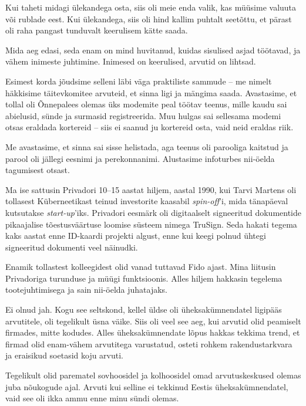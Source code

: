 
Kui taheti midagi ülekandega osta, siis oli meie enda valik, kas 
müüsime valuuta või rublade eest. Kui ülekandega, 
siis oli hind kallim puhtalt seetõttu, et pärast oli raha pangast tunduvalt keerulisem kätte saada.


Mida aeg edasi, seda enam on mind 
huvitanud, kuidas sisulised asjad töötavad, ja vähem 
inimeste juhtimine. Inimesed on keerulised, arvutid on 
lihtsad.


Esimest korda jõudsime selleni läbi väga praktiliste sammude -- me nimelt häkkisime 
täitevkomitee arvuteid, et sinna ligi ja mängima saada. 
Avastasime, et tollal oli Õnnepalees olemas üks modemite peal 
töötav teenus, mille kaudu sai abielusid, sünde ja surmasid registreerida. Muu hulgas sai sellesama 
modemi otsas eraldada kortereid -- siis ei saanud ju kortereid osta, 
vaid neid eraldas riik.


Me avastasime, et sinna sai sisse helistada, aga teenus oli parooliga kaitstud 
ja parool oli jällegi eesnimi ja perekonnanimi. Alustasime infoturbes nii-öelda 
tagumisest otsast.

Ma ise sattusin Privadori 10--15 aastat hiljem, 
aastal 1990, kui Tarvi Martens oli tollasest Küberneetikast teinud 
investorite kaasabil \emph{spin-off}'i, 
mida tänapäeval kutsutakse \emph{start-up}'iks. Privadori eesmärk oli 
digitaalselt signeeritud dokumentide pikaajalise tõestusväärtuse loomise 
süsteem nimega TruSign. Seda hakati tegema kaks aastat enne ID-kaardi 
projekti algust, enne kui keegi polnud ühtegi signeeritud dokumenti veel näinudki.


Enamik tollastest kolleegidest olid vanad tuttavad Fido ajast. Mina liitusin Privadoriga 
turunduse ja müügi funktsioonis. Alles hiljem hakkasin tegelema
tootejuhtimisega ja sain nii-öelda juhatajaks. 


Ei olnud jah. Kogu see seltskond, kellel üldse oli üheksakümnendatel 
ligipääs arvutitele, oli tegelikult üsna väike. Siis oli veel see aeg, kui arvutid olid 
peamiselt firmades, mitte kodudes. Alles üheksakümnendate lõpus hakkas 
tekkima trend, et firmad olid enam-vähem arvutitega varustatud, osteti
rohkem rakendustarkvara ja eraisikud soetasid koju arvuti.

Tegelikult olid parematel sovhoosidel ja kolhoosidel omad 
arvutuskeskused olemas juba nõukogude ajal. Arvuti kui selline ei 
tekkinud Eestis üheksakümnendatel, vaid see oli ikka ammu enne minu sündi 
olemas.
